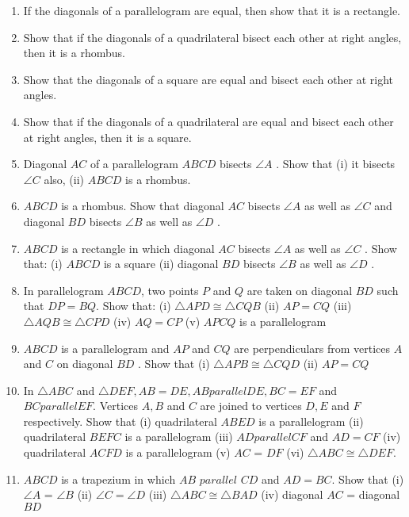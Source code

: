 \begin{enumerate}[label=\arabic*.,ref=\thesubsection.\theenumi]
%
\item If the diagonals of a parallelogram are equal, then show that it is a rectangle. 
\item Show that if the diagonals of a quadrilateral bisect each other at right angles, then it is a rhombus.
\item Show that the diagonals of a square are equal and bisect each other at right angles. 
\item Show that if the diagonals of a quadrilateral are equal and bisect each other at right angles, then it is a square.
\item Diagonal $AC$ of a parallelogram $ABCD$ bisects $\angle A$ . Show that
(i) it bisects  $\angle C$  also, (ii) $ABCD$ is a rhombus.
\item $ABCD$ is a rhombus. Show that diagonal $AC$ bisects $\angle A$ as well as  $\angle C$  and diagonal $BD$ bisects  $\angle B$  as well as  $\angle D$ .
\item $ABCD$ is a rectangle in which diagonal $AC$ bisects $\angle A$ as well as  $\angle C$ . Show that: (i) $ABCD$ is a square (ii) diagonal $BD$ bisects  $\angle B$  as well as  $\angle D$ .
\item In parallelogram $ABCD$, two points $P$ and $Q$ are taken on diagonal $BD$ such that $DP = BQ$. Show that: (i)  $\triangle  APD  \cong   \triangle  CQB$ (ii) $AP = CQ$ (iii)  $\triangle  AQB  \cong   \triangle  CPD$ (iv) $AQ = CP$ (v) $APCQ$ is a parallelogram
\item $ABCD$ is a parallelogram and $AP$ and $CQ$ are perpendiculars from vertices $A$ and $C$ on diagonal $BD$ . Show that (i)  $\triangle  APB  \cong   \triangle  CQD $ (ii) $AP = CQ$
\item In  $\triangle  ABC$ and  $\triangle  DEF, AB = DE, AB  parallel  DE, BC = EF$ and $BC  parallel  EF$. Vertices $A, B$ and $C$ are joined to vertices $D, E$ and $F$ respectively. Show that
(i) quadrilateral $ABED$ is a parallelogram (ii) quadrilateral $BEFC$ is a parallelogram (iii) $AD  parallel  CF$ and $AD = CF$ (iv) quadrilateral $ACFD$ is a parallelogram (v) $AC$ = $DF$ (vi)  $\triangle  ABC  \cong   \triangle  DEF$.
\item $ABCD$ is a trapezium in which $AB$  $parallel$  $CD$ and $AD = BC$. Show that (i)$\angle A$ =  $\angle B$  (ii)  $\angle C  =  \angle D$  (iii)  $\triangle  ABC  \cong   \triangle  BAD$ (iv) diagonal $AC$ = diagonal $BD$ 

\end{enumerate}
